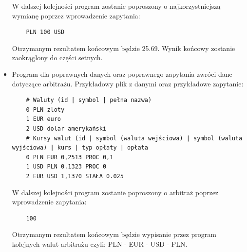 ﻿\documentclass[12pt]{article}
\begin{document}
\begin{itemize}
\begin{scriptsize}
{\begin{verbatim}
    \end{verbatim}}\end{scriptsize}
    W dalszej kolejności program zostanie poproszony o najkorzystniejszą wymianę poprzez wprowadzenie zapytania:
    \begin{scriptsize}{\begin{verbatim}
    PLN 100 USD
     \end{verbatim}}\end{scriptsize}
    Otrzymanym rezultatem końcowym będzie 25.69. Wynik końcowy zostanie zaokrąglony do części setnych.
    \item Program dla poprawnych danych oraz poprawnego zapytania zwróci dane dotyczące arbitrażu. Przykładowy plik z danymi oraz przykładowe zapytanie:
    \begin{scriptsize}{\begin{verbatim}
    # Waluty (id | symbol | pełna nazwa)
    0 PLN zloty
    1 EUR euro
    2 USD dolar amerykański
    # Kursy walut (id | symbol (waluta wejściowa) | symbol (waluta wyjściowa) | kurs | typ opłaty | opłata
    0 PLN EUR 0,2513 PROC 0,1
    1 USD PLN 0.1323 PROC 0
    2 EUR USD 1,1370 STAŁA 0.025
     \end{verbatim}}\end{scriptsize}
    W dalszej kolejności program zostanie poproszony o arbitraż poprzez wprowadzenie zapytania:
    \begin{scriptsize}{\begin{verbatim}
    100
     \end{verbatim}}\end{scriptsize}
     Otrzymanym rezultatem końcowym będzie wypisanie przez program kolejnych walut arbitrażu czyli:  PLN - EUR - USD - PLN.
    
\end{itemize}
\end{document}

